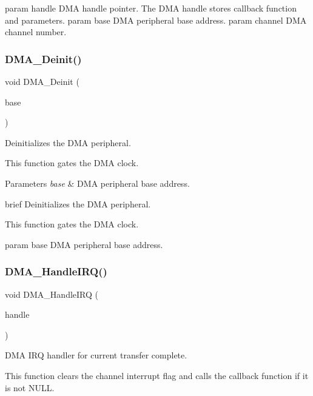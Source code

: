 param handle D\+MA handle pointer. The D\+MA handle stores callback function and parameters. param base D\+MA peripheral base address. param channel D\+MA channel number. \mbox{\label{group__dma_ga634ced9b86d7dc9543e0b4387123fcac}} 
\subsubsection{\texorpdfstring{DMA\_Deinit()}{DMA\_Deinit()}}
{\footnotesize\ttfamily void D\+M\+A\+\_\+\+Deinit (\begin{DoxyParamCaption}\item[{\mbox{\hyperlink{struct_d_m_a___type}{D\+M\+A\+\_\+\+Type}} $\ast$}]{base }\end{DoxyParamCaption})}



Deinitializes the D\+MA peripheral. 

This function gates the D\+MA clock.


\begin{DoxyParams}{Parameters}
{\em base} & D\+MA peripheral base address.\\
\hline
\end{DoxyParams}
brief Deinitializes the D\+MA peripheral.

This function gates the D\+MA clock.

param base D\+MA peripheral base address. \mbox{\label{group__dma_ga3484c491bd7943623d1d8fdc013c7e97}} 
\subsubsection{\texorpdfstring{DMA\_HandleIRQ()}{DMA\_HandleIRQ()}}
{\footnotesize\ttfamily void D\+M\+A\+\_\+\+Handle\+I\+RQ (\begin{DoxyParamCaption}\item[{\mbox{\hyperlink{group__dma_gac4a65788d7e5762d16a41a50b2cd7956}{dma\+\_\+handle\+\_\+t}} $\ast$}]{handle }\end{DoxyParamCaption})}



D\+MA I\+RQ handler for current transfer complete. 

This function clears the channel interrupt flag and calls the callback function if it is not N\+U\+LL.


